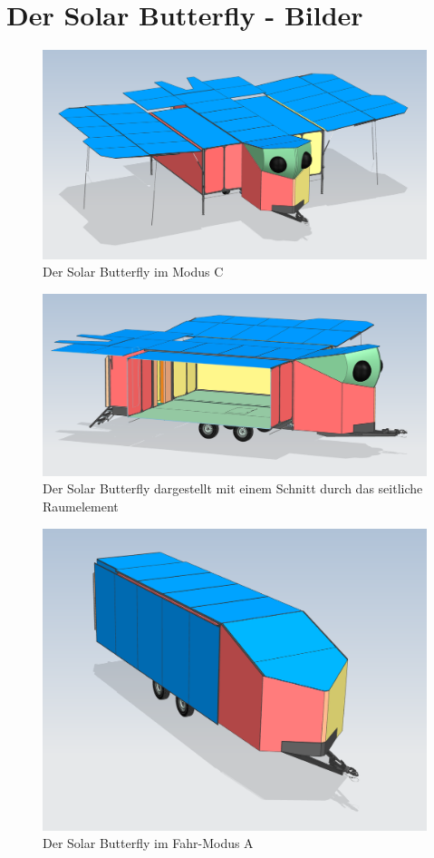 \section{Der Solar Butterfly - Bilder}
\label{Bilder SB}
\begin{figure}[H]
  \includegraphics[width=\linewidth]{04_Figures/SB10.png}
  \caption{Der Solar Butterfly im Modus C}
  \label{img:SB10}
\end{figure}
\begin{figure}[H]
  \includegraphics[width=\linewidth]{04_Figures/SB12.png}
  \caption{Der Solar Butterfly dargestellt mit einem Schnitt durch das seitliche Raumelement}
  \label{img:SB12}
\end{figure}
\begin{figure}[H]
  \includegraphics[width=\linewidth]{04_Figures/SB11.png}
  \caption{Der Solar Butterfly im Fahr-Modus A}
  \label{img:SB11}
\end{figure}

